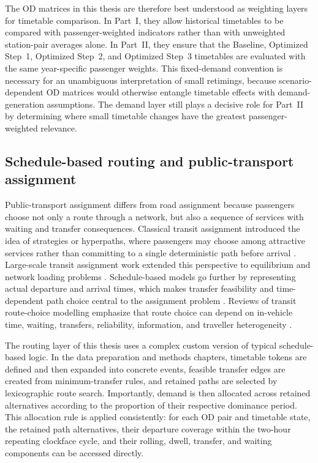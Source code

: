 \documentclass[preprint,12pt]{elsarticle}
\begin{document}
The OD matrices in this thesis are therefore best understood as weighting layers for timetable comparison. In Part~I, they allow historical timetables to be compared with passenger-weighted indicators rather than with unweighted station-pair averages alone. In Part~II, they ensure that the Baseline, Optimized Step~1, Optimized Step~2, and Optimized Step~3 timetables are evaluated with the same year-specific passenger weights. This fixed-demand convention is necessary for an unambiguous interpretation of small retimings, because scenario-dependent OD matrices would otherwise entangle timetable effects with demand-generation assumptions. The demand layer still plays a decisive role for Part~II by determining where small timetable changes have the greatest passenger-weighted relevance.

\subsection{Schedule-based routing and public-transport assignment}\label{sec:reviewrouting}

Public-transport assignment differs from road assignment because passengers choose not only a route through a network, but also a sequence of services with waiting and transfer consequences. Classical transit assignment introduced the idea of strategies or hyperpaths, where passengers may choose among attractive services rather than committing to a single deterministic path before arrival \citep{spiessFlorian1989OptimalStrategies}. Large-scale transit assignment work extended this perspective to equilibrium and network loading problems \citep{nguyenPallottino1988TransitAssignment}. Schedule-based models go further by representing actual departure and arrival times, which makes transfer feasibility and time-dependent path choice central to the assignment problem \citep{nuzzoloRussoCrisalli2001ScheduleAssignment}. Reviews of transit route-choice modelling emphasize that route choice can depend on in-vehicle time, waiting, transfers, reliability, information, and traveller heterogeneity \citep{liuBunkerFerreira2010Review}.

The routing layer of this thesis uses a complex custom version of typical schedule-based logic. In the data preparation and methods chapters, timetable tokens are defined and then expanded into concrete events, feasible transfer edges are created from minimum-transfer rules, and retained paths are selected by lexicographic route search. Importantly, demand is then allocated across retained alternatives according to the proportion of their respective dominance period. This allocation rule is applied consistently: for each OD pair and timetable state, the retained path alternatives, their departure coverage within the two-hour repeating clockface cycle, and their rolling, dwell, transfer, and waiting components can be accessed directly.
\end{document}
